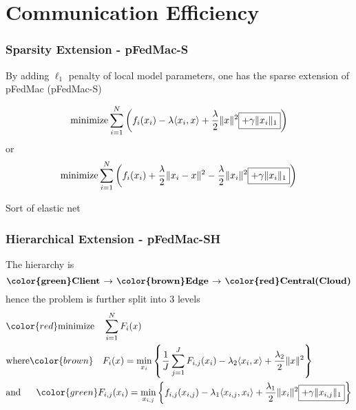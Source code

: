 
\section[Communication]{Communication Efficiency}


\begin{frame}
\frametitle{Sparsity Extension - pFedMac-S}

By adding $\ell_1$ penalty of local model parameters, one has the sparse extension of pFedMac (pFedMac-S)

$$\text{minimize} \sum\limits_{i=1}^N \left( f_i(x_i) - \lambda \langle x_i, x \rangle + \dfrac{\lambda}{2} \lVert x \rVert^2 \framebox{$+ \gamma \lVert x_i \rVert_1$} \right)$$
or
$$\text{minimize} \sum\limits_{i=1}^N \left( f_i(x_i) + \dfrac{\lambda}{2} \lVert x_i - x \rVert^2 - \dfrac{\lambda}{2} \lVert x_i \rVert^2 \framebox{$+ \gamma \lVert x_i \rVert_1$} \right)$$

\pause
\vspace{0.5em}

Sort of elastic net

\end{frame}


\begin{frame}
\frametitle{Hierarchical Extension - pFedMac-SH}

The hierarchy is
$$\text{\bf {\color{green}Client} $\to$ {\color{brown}Edge} $\to$ {\color{red}Central(Cloud)}}$$
hence the problem is further split into 3 levels
{\smaller
\begin{align*}
    & {\color{red}\text{minimize} \quad \sum\limits_{i=1}^N F_i(x)} \\
    & \text{where} {\color{brown}\quad F_i(x) = \min_{x_i} \left\{ \dfrac{1}{J} \sum\limits_{j=1}^J F_{i,j}(x_i) - \lambda_2 \langle x_i, x \rangle  + \dfrac{\lambda_2}{2} \lVert x \rVert^2 \right\}} \\
    & \text{and} \quad \ \ {\color{green}F_{i,j}(x_i) = \min_{x_{i,j}} \left\{ f_{i,j}(x_{i,j}) - \lambda_1 \langle x_{i,j}, x_i \rangle  + \dfrac{\lambda_1}{2} \lVert x_i \rVert^2 \framebox{$+ \gamma \lVert x_{i,j} \rVert_1$} \right\}}
\end{align*}
}

\end{frame}


